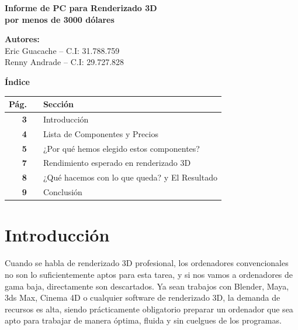 \documentclass[12pt,a4paper]{article}
\begin{document}
	
	\begin{titlepage}
		\centering
		\thispagestyle{fancy} %
		
		\vspace*{9cm} 
		
		{\Huge\textbf{Informe de PC para Renderizado 3D\\ por menos de 3000 dólares}}
		
		\vspace{2cm} 
		
		{\large\textbf{Autores:}} \\[0.3cm]
		{\large Eric Guacache -- C.I: 31.788.759} \\[0.2cm]
		{\large Renny Andrade -- C.I: 29.727.828}
		
		\vfill %
	\end{titlepage}
	
	\clearpage
	
	\begin{center}
		\vspace*{1cm}
		{\Huge\textbf{Índice}}
		\vspace{2cm}
		
		\begin{tabular}{r p{1cm} l}
			\large\textbf{Pág.} & & \large\textbf{Sección} \\
			\midrule[1pt]
			\textbf{3} & \dotfill & Introducción \\
			\textbf{4} & \dotfill & Lista de Componentes y Precios \\
			\textbf{5} & \dotfill & ¿Por qué hemos elegido estos componentes? \\
			\textbf{7} & \dotfill & Rendimiento esperado en renderizado 3D \\
			\textbf{8} & \dotfill & ¿Qué hacemos con lo que queda? y El Resultado \\
			\textbf{9} & \dotfill & Conclusión \\
		\end{tabular}
	\end{center}
	
	\clearpage
	
	\section{Introducción}
	Cuando se habla de renderizado 3D profesional, los ordenadores convencionales no son lo suficientemente aptos para esta tarea, y si nos vamos a ordenadores de gama baja, directamente son descartados. Ya sean trabajos con Blender, Maya, 3ds Max, Cinema 4D o cualquier software de renderizado 3D, la demanda de recursos es alta, siendo prácticamente obligatorio preparar un ordenador que sea apto para trabajar de manera óptima, fluida y sin cuelgues de los programas.
	
\end{document}
